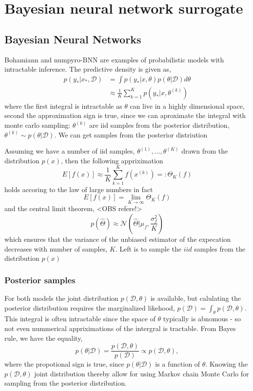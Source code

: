 \chapter{Bayesian neural network surrogate}
\section{Bayesian Neural Networks}
Bohamiann and numpyro-BNN are examples of probabilistic models with intractable inference. The predictive density is given as, 
\begin{align*}
    p(y_*|x_*,\mathcal{D}) &= \int p(y_*|x, \theta)p(\theta|\mathcal{D})d\theta\\
    &\approx \frac{1}{K} \sum_{k=1}^K p(y_*|x, \theta^{(k)})
\end{align*}
where the first integral is intractable as $\theta$ can live in a highly dimensional space, second the approximation sign
is true, since we can aproximate the integral with monte carlo sampling: $\theta^{(k)}$ are iid samples from the posterior 
distribution, $\theta^{(k)} \sim p(\theta|\mathcal{D})$. We can get samples from the posterior distriution

\begin{testexample2}
    Assuming we have a number of iid samples, $\theta^{(1)}, \dots, \theta^{(K)}$ drawn from the
    distribution $p(x)$, then the following appriximation 
    $$E[f(x)] \approx \frac{1}{K} \sum_{k=1}^K f(x^{(k)}) =: \Theta_{K}(f)$$
    holds accoring to the law of large numbers 
    in fact $$E[f(x)] = \lim_{K \rightarrow \infty} \Theta_{K}(f)$$
    and the central limit theorem, <OBS refere!>
    $$p(\hat \Theta) \approx \mathcal{N}(\hat \Theta |\mu_f, \frac{\sigma_f^2}{K})$$
    which ensures that the variance of the unbiased estimator of the expecation decreases
    with number of samples, $K$. Left is to sample the $iid$ samples from the distribution $p(x)$
\end{testexample2}
\subsection*{Posterior samples}
For both models 
the joint distribution $p(\mathcal{D},\theta)$ is available, but calulating the posterior distribution requires the
marginalized likehood, $p(\mathcal{D}) = \int_{\theta} p(\mathcal{D},\theta)$. This integral is often intractable
since the space of $\theta$ typically is abnomous - so not even nummerical appriximations of the intergral is tractable.
From Bayes rule, we have the equality, 
$$p(\theta|\mathcal{D}) = \frac{p(\mathcal{D},\theta)}{p(\mathcal{D})} \propto p(\mathcal{D},\theta),$$
where the propotional sign is true, since $p(\theta|\mathcal{D})$ is a function of $\theta$. 
Knowing the $p(\mathcal{D},\theta)$ joint distribution thereby allow for using Markov chain Monte Carlo
for sampling from the posterior distribution.  

